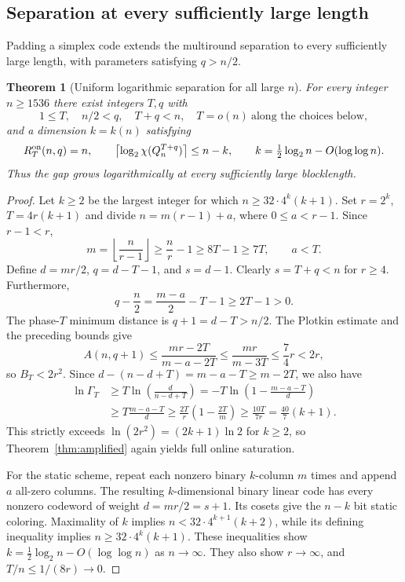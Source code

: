 \documentclass[11pt,a4paper]{article}
\newtheorem{theorem}{Theorem}[section]
\begin{document}
\subsection{Separation at every sufficiently large length}\label{subsec:alln}
Padding a simplex code extends the multiround separation to every sufficiently large length, with parameters satisfying $q>n/2$.
\begin{theorem}[Uniform logarithmic separation for all large $n$]\label{thm:alln}
For every integer $n\ge1536$ there exist integers $T,q$ with
\[
 1\le T,\quad n/2<q,\quad T+q<n,
 \quad T=o(n)\ \text{along the choices below},
\]
and a dimension $k=k(n)$ satisfying
\begin{equation}\label{eq:alln}
 R_T^{\rm on}(n,q)=n,\qquad
 \left\lceil\log_2\chi(Q_n^{T+q})\right\rceil\le n-k,
 \qquad k=\tfrac12\log_2n-O(\log\log n).
\end{equation}
Thus the gap grows logarithmically at every sufficiently large blocklength.
\end{theorem}
\begin{proof}
Let $k\ge2$ be the largest integer for which $n\ge32\cdot4^k(k+1)$. Set $r=2^k$, $T=4r(k+1)$ and divide $n=m(r-1)+a$, where $0\le a<r-1$. Since $r-1<r$,
\[
 m=\left\lfloor\frac n{r-1}\right\rfloor
 \ge\frac nr-1\ge 8T-1\ge7T,
 \qquad a<T.
\]
Define $d=mr/2$, $q=d-T-1$, and $s=d-1$. Clearly $s=T+q<n$ for $r\ge4$. Furthermore,
\[
 q-\frac n2=\frac{m-a}{2}-T-1
 \ge2T-1>0.
\]
The phase-$T$ minimum distance is $q+1=d-T>n/2$. The Plotkin estimate and the preceding bounds give
\[
 A(n,q+1)\le\frac{mr-2T}{m-a-2T}
 \le\frac{mr}{m-3T}\le\frac74r<2r,
\]
so $B_T<2r^2$. Since $d-(n-d+T)=m-a-T\ge m-2T$, we also have
\begin{align*}
 \ln\Gamma_T&\ge T\ln\left(\frac d{n-d+T}\right)
 =-T\ln\left(1-\frac{m-a-T}{d}\right)\\
 &\ge T\frac{m-a-T}{d}
 \ge\frac{2T}{r}\left(1-\frac{2T}m\right)
 \ge\frac{10T}{7r}=\frac{40}{7}(k+1).
\end{align*}
This strictly exceeds $\ln(2r^2)=(2k+1)\ln2$ for $k\ge2$, so Theorem~\ref{thm:amplified} again yields full online saturation.

For the static scheme, repeat each nonzero binary $k$-column $m$ times and append $a$ all-zero columns. The resulting $k$-dimensional binary linear code has every nonzero codeword of weight $d=mr/2=s+1$. Its cosets give the $n-k$ bit static coloring. Maximality of $k$ implies $n<32\cdot4^{k+1}(k+2)$, while its defining inequality implies $n\ge32\cdot4^k(k+1)$. These inequalities show $k=\frac12\log_2n-O(\log\log n)$ as $n\to\infty$. They also show $r\to\infty$, and $T/n\le1/(8r)\to0$.
\end{proof}
\end{document}
